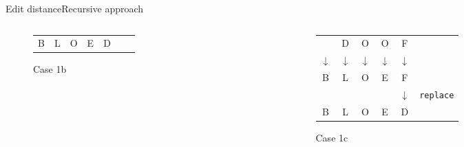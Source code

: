 \begin{frame}{Edit distance}{Recursive approach}
\begin{columns}[T]
\begin{column}{0.3\linewidth}
\begin{figure}[!h]
\begin{center}
\begin{tabular}{c@{}c@{}c@{}c@{}c@{}c@{}l}
            B & L & O & E & D
          \end{tabular}
        \end{center}
        \caption{Case 1b}
      \end{figure}
    \end{column}
    \begin{column}{0.3\linewidth}
      \begin{figure}[!h]
        \begin{center}
          \begin{tabular}{c@{}c@{}c@{}c@{}c@{}l}
            {} & \color{MainA}D & \color{MainA}O &
            \color{MainA}O & \color{MainA}F\\
            \color{MainA}$\downarrow$ & \color{MainA}$\downarrow$ &
            \color{MainA}$\downarrow$ & \color{MainA}$\downarrow$ &
            \color{MainA}$\downarrow$\\
            \color{MainA}B & \color{MainA}L & \color{MainA}O &
            \color{MainA}E & \color{MainA}F\\
            {} & {} & {} & {} & $\downarrow$ & \texttt{replace}\\
            B & L & O & E & D
          \end{tabular}
        \end{center}
        \caption{Case 1c}
      \end{figure}
    \end{column}
  \end{columns}
\end{frame}


